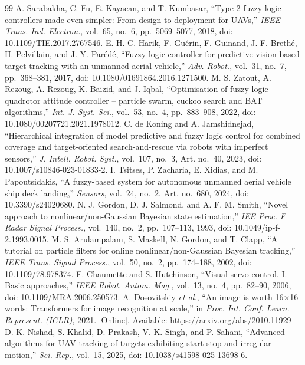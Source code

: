 \documentclass[conference,a4paper]{IEEEtran}
\begin{document}
\begin{thebibliography}{99}
 A. Sarabakha, C. Fu, E. Kayacan, and T. Kumbasar, ``Type-2 fuzzy logic controllers made even simpler: From design to deployment for UAVs,'' \emph{IEEE Trans. Ind. Electron.}, vol.~65, no.~6, pp.~5069--5077, 2018, doi: 10.1109/TIE.2017.2767546.
 E. H. C. Harik, F. Guérin, F. Guinand, J.-F. Brethé, H. Pelvillain, and J.-Y. Parédé, ``Fuzzy logic controller for predictive vision-based target tracking with an unmanned aerial vehicle,'' \emph{Adv. Robot.}, vol.~31, no.~7, pp.~368--381, 2017, doi: 10.1080/01691864.2016.1271500.
 M. S. Zatout, A. Rezoug, A. Rezoug, K. Baizid, and J. Iqbal, ``Optimisation of fuzzy logic quadrotor attitude controller -- particle swarm, cuckoo search and BAT algorithms,'' \emph{Int. J. Syst. Sci.}, vol.~53, no.~4, pp.~883--908, 2022, doi: 10.1080/00207721.2021.1978012.
 C. de Koning and A. Jamshidnejad, ``Hierarchical integration of model predictive and fuzzy logic control for combined coverage and target-oriented search-and-rescue via robots with imperfect sensors,'' \emph{J. Intell. Robot. Syst.}, vol.~107, no.~3, Art. no.~40, 2023, doi: 10.1007/s10846-023-01833-2.
 I. Tsitses, P. Zacharia, E. Xidias, and M. Papoutsidakis, ``A fuzzy-based system for autonomous unmanned aerial vehicle ship deck landing,'' \emph{Sensors}, vol.~24, no.~2, Art. no.~680, 2024, doi: 10.3390/s24020680.
 N. J. Gordon, D. J. Salmond, and A. F. M. Smith, ``Novel approach to nonlinear/non-Gaussian Bayesian state estimation,'' \emph{IEE Proc. F Radar Signal Process.}, vol.~140, no.~2, pp.~107--113, 1993, doi: 10.1049/ip-f-2.1993.0015.
 M. S. Arulampalam, S. Maskell, N. Gordon, and T. Clapp, ``A tutorial on particle filters for online nonlinear/non-Gaussian Bayesian tracking,'' \emph{IEEE Trans. Signal Process.}, vol.~50, no.~2, pp.~174--188, 2002, doi: 10.1109/78.978374.
 F. Chaumette and S. Hutchinson, ``Visual servo control. I. Basic approaches,'' \emph{IEEE Robot. Autom. Mag.}, vol.~13, no.~4, pp.~82--90, 2006, doi: 10.1109/MRA.2006.250573.
 A. Dosovitskiy \emph{et al.}, ``An image is worth 16$\times$16 words: Transformers for image recognition at scale,'' in \emph{Proc. Int. Conf. Learn. Represent. (ICLR)}, 2021. [Online]. Available: \url{https://arxiv.org/abs/2010.11929}
 D. K. Nishad, S. Khalid, D. Prakash, V. K. Singh, and P. Sahani, ``Advanced algorithms for UAV tracking of targets exhibiting start-stop and irregular motion,'' \emph{Sci. Rep.}, vol.~15, 2025, doi: 10.1038/s41598-025-13698-6.
\end{thebibliography}
\end{document}

